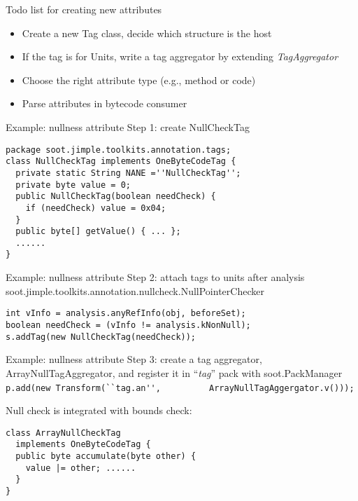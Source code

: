 \begin{slide}{Todo list for creating new attributes}
\begin{itemize}
\item Create a new Tag class, decide which structure is the host
\item If the tag is for Units, write a tag aggregator by extending {\em TagAggregator}
\item Choose the right attribute type (e.g., method or code)
\item Parse attributes in bytecode consumer
\end{itemize}
\end{slide}

\begin{slide}{Example: nullness attribute}
Step 1: create NullCheckTag
\footnotesize{
\begin{verbatim}
package soot.jimple.toolkits.annotation.tags;
class NullCheckTag implements OneByteCodeTag {
  private static String NANE =''NullCheckTag'';
  private byte value = 0;
  public NullCheckTag(boolean needCheck) {
    if (needCheck) value = 0x04;
  }
  public byte[] getValue() { ... };
  ......
}
\end{verbatim}
}
\end{slide}

\begin{slide}{Example: nullness attribute}
Step 2: attach tags to units after analysis \\
{\small soot.jimple.toolkits.annotation.nullcheck.NullPointerChecker}
\footnotesize{
\begin{verbatim}
int vInfo = analysis.anyRefInfo(obj, beforeSet);
boolean needCheck = (vInfo != analysis.kNonNull); 
s.addTag(new NullCheckTag(needCheck));
\end{verbatim}
}
\end{slide}

\begin{slide}{Example: nullness attribute}
Step 3: create a tag aggregator, ArrayNullTagAggregator, and
register it in ``{\em tag}'' pack with soot.PackManager
{\scriptsize \verb$ p.add(new Transform(``tag.an'',$
   \verb$         ArrayNullTagAggergator.v())); $}

\vspace{.1in}
{\small Null check is integrated with bounds check:} 
\footnotesize{
\begin{verbatim}
class ArrayNullCheckTag 
  implements OneByteCodeTag {
  public byte accumulate(byte other) {
    value |= other; ......
  }
}
\end{verbatim}
}
\end{slide}

